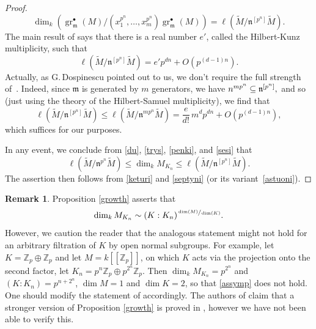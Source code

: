 \documentclass[JEP,XML,SOM,Unicode,NoEqCountersInSection]{cedram}
\newcommand{\sbullet}{{\scriptscriptstyle\bullet}}
\theoremstyle{definition}
\newtheorem{remark}[prop]{Remark}
\DeclareMathOperator{\gr}{gr}
\newcommand{\br}[1]{[\![#1]\!]}
\newcommand{\Zp}{\mathbb{Z}_p}
\newcommand{\mm}{\mathfrak m}
\newcommand{\nn}{\mathfrak n}
\begin{document}
\begin{proof}
\begin{equation}\label{sesi}
\dim_k (\gr^{\sbullet}_{\mm}(M)/(x_1^{p^n}, \ldots, x_m^{p^n})\gr^{\sbullet}_{\mm}(M) )= \ell(\widetilde{M}/\nn^{[p^n]} \widetilde{M}).
\end{equation}
The main result of \cite{monsky} says that there is a real number $e'$, called the Hilbert-Kunz multiplicity, such that
\begin{equation}\label{septyni}
\ell(\widetilde{M}/\nn^{[p^n]} \widetilde{M})= e' p^{dn} + O(p^{(d-1)n}).
\end{equation}
Actually, as G.\,Dospinescu pointed out to us, we don't require the full strength
of~\cite{monsky}. Indeed, since $\mathfrak m$ is generated by $m$ generators,
we have $\mathfrak \nn^{m p^n} \subseteq \nn^{[p^n]},$
and so (just using the theory of the Hilbert-Samuel multiplicity),
we find that
\begin{equation}
\label{astuoni}
\ell(\widetilde{M}/\nn^{[p^n]} \widetilde{M})
\leq \ell(\widetilde{M}/\nn^{m p^n} \widetilde{M}) = \dfrac{e}{d!}\,m^d p^{dn}
+ O(p^{(d-1)n}),
\end{equation}
which suffices for our purposes.

In any event,
we conclude from \eqref{du}, \eqref{trys}, \eqref{penki}, and \eqref{sesi}
that
\[
\ell(\widetilde{M}/\nn^{p^n} \widetilde{M})\le \dim_k M_{K_n} \le
\ell(\widetilde{M}/\nn^{[p^n]} \widetilde{M}).
\]
The assertion then follows from
\eqref{keturi} and \eqref{septyni} (or its variant~\eqref{astuoni}). \end{proof}

\begin{remark}Proposition \ref{growth} asserts that \begin{equation}
\label{assymp} \dim_k M_{K_n}\sim (K: K_n)^{\sfrac{\dim(M)} {\dim (K)}}.
\end{equation} However, we caution the reader that the analogous statement
might not hold for an arbitrary filtration of $K$ by open normal subgroups. For
example, let $K=\Zp \oplus \Zp$ and let $M=k\br{\Zp}$, on which $K$ acts via
the projection onto the second factor, let $K_n= p^n \Zp \oplus p^{2^n} \Zp$.
Then $\dim_k M_{K_n}= p^{2^n}$ and $(K:K_n)= p^{n+2^n}$, $\dim M=1$ and $\dim
K=2$, so that \eqref{assymp} does not hold. One should modify the statement of \hbox{\cite[Th.\,1.18]{calegari-emerton}} accordingly. The authors of
\cite{calegari-emerton} claim that a stronger version of Proposition \ref{growth} is proved in
\cite[\S 5]{ardakov_brown}, however we have not been able to verify this.
\end{remark}
\end{document}
